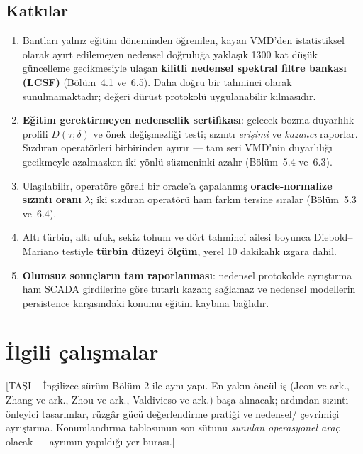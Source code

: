 \documentclass[11pt,a4paper]{article}
\newcommand{\tasi}[1]{\textsf{\small [TAŞI -- #1]}}
\begin{document}
\subsection{Katkılar}

\begin{enumerate}
\item Bantları yalnız eğitim döneminden öğrenilen, kayan VMD'den istatistiksel
olarak ayırt edilemeyen nedensel doğruluğa yaklaşık 1300 kat düşük güncelleme
gecikmesiyle ulaşan \textbf{kilitli nedensel spektral filtre bankası (LCSF)}
(Bölüm~4.1 ve~6.5). Daha doğru bir tahminci olarak sunulmamaktadır; değeri
dürüst protokolü uygulanabilir kılmasıdır.
\item \textbf{Eğitim gerektirmeyen nedensellik sertifikası}: gelecek-bozma
duyarlılık profili $D(\tau;\delta)$ ve önek değişmezliği testi; sızıntı
\emph{erişimi} ve \emph{kazancı} raporlar. Sızdıran operatörleri birbirinden
ayırır --- tam seri VMD'nin duyarlılığı gecikmeyle azalmazken iki yönlü
süzmeninki azalır (Bölüm~5.4 ve~6.3).
\item Ulaşılabilir, operatöre göreli bir oracle'a çapalanmış
\textbf{oracle-normalize sızıntı oranı} $\lambda$; iki sızdıran operatörü ham
farkın tersine sıralar (Bölüm~5.3 ve~6.4).
\item Altı türbin, altı ufuk, sekiz tohum ve dört tahminci ailesi boyunca
Diebold--Mariano testiyle \textbf{türbin düzeyi ölçüm}, yerel 10 dakikalık
ızgara dahil.
\item \textbf{Olumsuz sonuçların tam raporlanması}: nedensel protokolde
ayrıştırma ham SCADA girdilerine göre tutarlı kazanç sağlamaz ve nedensel
modellerin persistence karşısındaki konumu eğitim kaybına bağlıdır.
\end{enumerate}

\section{İlgili çalışmalar}
\tasi{İngilizce sürüm Bölüm 2 ile aynı yapı. En yakın öncül iş (Jeon ve ark.,
Zhang ve ark., Zhou ve ark., Valdivieso ve ark.) başa alınacak; ardından
sızıntı-önleyici tasarımlar, rüzgâr gücü değerlendirme pratiği ve nedensel/
çevrimiçi ayrıştırma. Konumlandırma tablosunun son sütunu
\emph{sunulan operasyonel araç} olacak --- ayrımın yapıldığı yer burası.}

\end{document}

